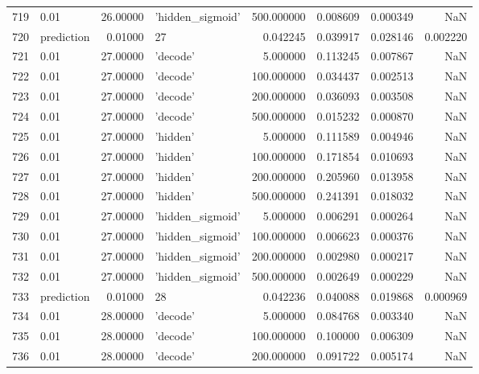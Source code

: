 \documentclass[10pt,a4paper]{article}
\begin{document}
\begin{tabular}{llrlrrrr}
719  &        0.01 &  26.00000 &   'hidden\_sigmoid' &  500.000000 &  0.008609 &  0.000349 &       NaN \\
720  &  prediction &   0.01000 &                 27 &    0.042245 &  0.039917 &  0.028146 &  0.002220 \\
721  &        0.01 &  27.00000 &           'decode' &    5.000000 &  0.113245 &  0.007867 &       NaN \\
722  &        0.01 &  27.00000 &           'decode' &  100.000000 &  0.034437 &  0.002513 &       NaN \\
723  &        0.01 &  27.00000 &           'decode' &  200.000000 &  0.036093 &  0.003508 &       NaN \\
724  &        0.01 &  27.00000 &           'decode' &  500.000000 &  0.015232 &  0.000870 &       NaN \\
725  &        0.01 &  27.00000 &           'hidden' &    5.000000 &  0.111589 &  0.004946 &       NaN \\
726  &        0.01 &  27.00000 &           'hidden' &  100.000000 &  0.171854 &  0.010693 &       NaN \\
727  &        0.01 &  27.00000 &           'hidden' &  200.000000 &  0.205960 &  0.013958 &       NaN \\
728  &        0.01 &  27.00000 &           'hidden' &  500.000000 &  0.241391 &  0.018032 &       NaN \\
729  &        0.01 &  27.00000 &   'hidden\_sigmoid' &    5.000000 &  0.006291 &  0.000264 &       NaN \\
730  &        0.01 &  27.00000 &   'hidden\_sigmoid' &  100.000000 &  0.006623 &  0.000376 &       NaN \\
731  &        0.01 &  27.00000 &   'hidden\_sigmoid' &  200.000000 &  0.002980 &  0.000217 &       NaN \\
732  &        0.01 &  27.00000 &   'hidden\_sigmoid' &  500.000000 &  0.002649 &  0.000229 &       NaN \\
733  &  prediction &   0.01000 &                 28 &    0.042236 &  0.040088 &  0.019868 &  0.000969 \\
734  &        0.01 &  28.00000 &           'decode' &    5.000000 &  0.084768 &  0.003340 &       NaN \\
735  &        0.01 &  28.00000 &           'decode' &  100.000000 &  0.100000 &  0.006309 &       NaN \\
736  &        0.01 &  28.00000 &           'decode' &  200.000000 &  0.091722 &  0.005174 &       NaN \\

\end{tabular}
\end{document}
